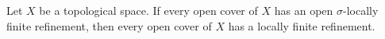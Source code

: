 Let $X$ be a topological space. If every open cover of $X$ has an open $\sigma$-locally finite refinement, then every open cover of $X$ has a locally finite refinement.

